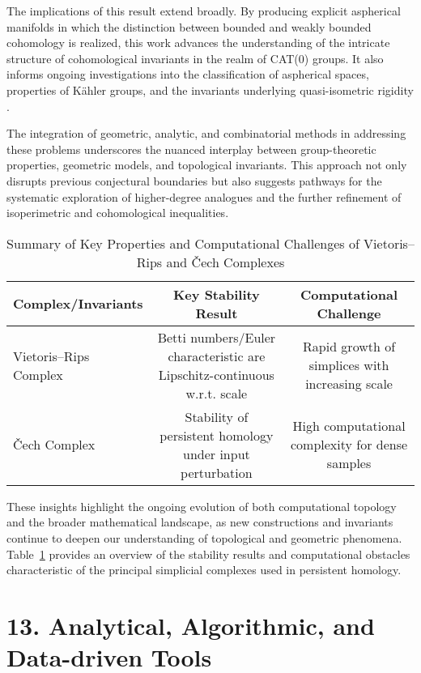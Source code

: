 \documentclass[11pt]{article}
\begin{document}
The implications of this result extend broadly. By producing explicit aspherical manifolds in which the distinction between bounded and weakly bounded cohomology is realized, this work advances the understanding of the intricate structure of cohomological invariants in the realm of CAT(0) groups. It also informs ongoing investigations into the classification of aspherical spaces, properties of Kähler groups, and the invariants underlying quasi-isometric rigidity \cite{ref84}. 

The integration of geometric, analytic, and combinatorial methods in addressing these problems underscores the nuanced interplay between group-theoretic properties, geometric models, and topological invariants. This approach not only disrupts previous conjectural boundaries but also suggests pathways for the systematic exploration of higher-degree analogues and the further refinement of isoperimetric and cohomological inequalities. 

\begin{table}[ht]
\centering
\begin{tabular}{|l|c|c|}
\hline
\textbf{Complex/Invariants} & \textbf{Key Stability Result} & \textbf{Computational Challenge} \\
\hline
Vietoris--Rips Complex      & Betti numbers/Euler characteristic are Lipschitz-continuous w.r.t. scale & Rapid growth of simplices with increasing scale \\
\hline
Čech Complex                & Stability of persistent homology under input perturbation & High computational complexity for dense samples \\
\hline
\end{tabular}
\caption{Summary of Key Properties and Computational Challenges of Vietoris--Rips and Čech Complexes}
\label{tab:tda_complexes}
\end{table}

These insights highlight the ongoing evolution of both computational topology and the broader mathematical landscape, as new constructions and invariants continue to deepen our understanding of topological and geometric phenomena. Table~\ref{tab:tda_complexes} provides an overview of the stability results and computational obstacles characteristic of the principal simplicial complexes used in persistent homology.

\section{13. Analytical, Algorithmic, and Data-driven Tools}
\end{document}
